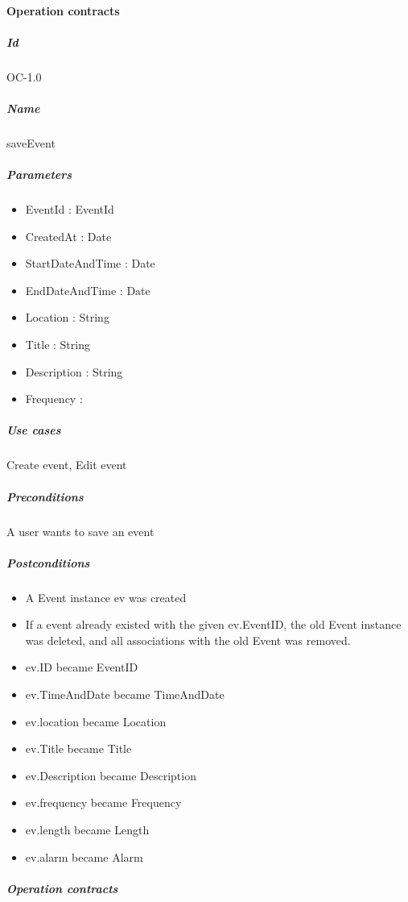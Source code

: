 \paragraph{Operation contracts} \mbox{}
	\subparagraph{Id}
	OC-1.0
	\subparagraph{Name}
	saveEvent
	\subparagraph{Parameters} \mbox{}
	\begin{itemize}
	\item EventId : EventId
	\item CreatedAt : Date
	\item StartDateAndTime : Date
	\item EndDateAndTime : Date
	\item Location : String
	\item Title : String
	\item Description : String
	\item Frequency : 
	\end{itemize}
	
	\subparagraph{Use cases} \mbox{}
	Create event, Edit event
	
	\subparagraph{Preconditions} \mbox{}
	A user wants to save an event
	
	\subparagraph{Postconditions} \mbox{}
	\begin{itemize}
	\item A Event instance ev was created
	\item If a event already existed with the given ev.EventID, the old Event instance was deleted, and all associations with the old Event was removed.
		\item ev.ID became EventID
		\item ev.TimeAndDate became TimeAndDate
		\item ev.location became Location       
		\item ev.Title became Title
		\item ev.Description became Description
		\item ev.frequency became Frequency        
		\item ev.length became Length
		\item ev.alarm became Alarm 
	\end{itemize}
	

\subparagraph{Operation contracts} \mbox{} 
  
